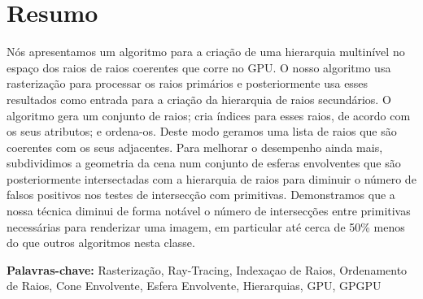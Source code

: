 
\section*{Resumo}


Nós apresentamos um algoritmo para a criação de uma hierarquia multinível no espaço dos raios de raios coerentes que corre no GPU. O nosso algoritmo usa rasterização para processar os raios primários e posteriormente usa esses resultados como entrada para a criação da hierarquia de raios secundários. O algoritmo gera um conjunto de raios; cria índices para esses raios, de acordo com os seus atributos; e ordena-os. Deste modo geramos uma lista de raios que são coerentes com os seus adjacentes. Para melhorar o desempenho ainda mais, subdividimos a geometria da cena num conjunto de esferas envolventes que são posteriormente intersectadas com a hierarquia de raios para diminuir o número de falsos positivos nos testes de intersecção com primitivas. Demonstramos que a nossa técnica diminui de forma notável o número de intersecções entre primitivas necessárias para renderizar uma imagem, em particular até cerca de 50\% menos do que outros algoritmos nesta classe.

\vfill

\textbf{\Large Palavras-chave:} {Rasterização, Ray-Tracing, Indexaçao de Raios, Ordenamento de Raios, Cone Envolvente, Esfera Envolvente, Hierarquias, GPU, GPGPU}